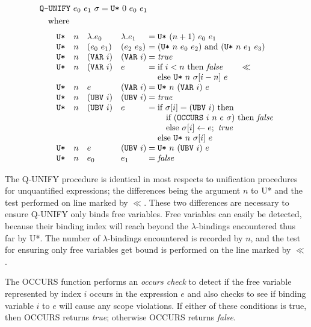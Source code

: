 \[
\begin{aligned}
&\THOR{Q-UNIFY}\ e_0\ e_1\ \sigma = \THOR{U*}\ 0\ e_0\ e_1\\
&\quad\text{where}\\[.25em]
&\qquad\begin{array}{@{}llll@{\;}l@{\;}l@{}}
\THOR{U*}&n&\lambda.e_0&\lambda.e_1 &=& \THOR{U*}\ (n+1)\ e_0\ e_1\\
\THOR{U*}&n&(e_0\ e_1)&(e_2\ e_3) &=& (\THOR{U*}\ n\ e_0\ e_2)\ \text{and}\ (\THOR{U*}\ n\ e_1\ e_3)\\
\THOR{U*}&n&(\THOR{VAR}\ i)&(\THOR{VAR}\ i) &=& \mathit{true}\\
\THOR{U*}&n&(\THOR{VAR}\ i)&e &=& \text{if }i<n\text{ then }\mathit{false}\qquad\ll\\
&&&&&\text{else }\THOR{U*}\ n\ \sigma[i-n]\ e\\
\THOR{U*}&n&e&(\THOR{VAR}\ i) &=& \THOR{U*}\ n\ (\THOR{VAR}\ i)\ e\\
\THOR{U*}&n&(\THOR{UBV}\ i)&(\THOR{UBV}\ i) &=& \mathit{true}\\
\THOR{U*}&n&(\THOR{UBV}\ i)&e &=& \text{if }\sigma[i]=(\THOR{UBV}\ i)\text{ then}\\
&&&&&\quad\text{if }(\THOR{OCCURS}\ i\ n\ e\ \sigma)\text{ then }\mathit{false}\\
&&&&&\quad\text{else }\sigma[i]\leftarrow e;\ \mathit{true}\\
&&&&&\text{else }\THOR{U*}\ n\ \sigma[i]\ e\\
\THOR{U*}&n&e&(\THOR{UBV}\ i) &=& \THOR{U*}\ n\ (\THOR{UBV}\ i)\ e\\
\THOR{U*}&n&e_0&e_1 &=& \mathit{false}
\end{array}
\end{aligned}
\]

The Q-UNIFY procedure is identical in most respects to unification procedures
for unquantified expressions; the differences being the argument \(n\) to U*
and the test performed on line marked by \(\ll\). These two differences are
necessary to ensure Q-UNIFY only binds free variables. Free variables can easily
be detected, because their binding index will reach beyond the
\(\lambda\)-bindings encountered thus far by U*. The number of
\(\lambda\)-bindings encountered is recorded by \(n\), and the test for ensuring
only free variables get bound is performed on the line marked by \(\ll\).

The OCCURS function performs an \emph{occurs check} to detect if the free variable
represented by index \(i\) occurs in the expression \(e\) and also checks to see
if binding variable \(i\) to \(e\) will cause any scope violations. If either
of these conditions is true, then OCCURS returns \emph{true}; otherwise OCCURS returns
\emph{false}.


